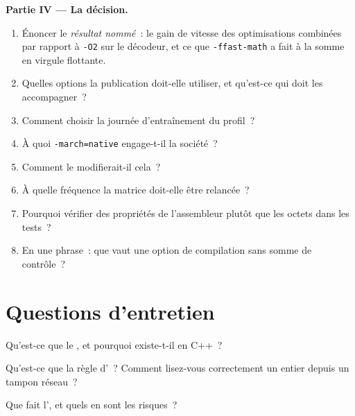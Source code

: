 \begin{problem}
\medskip\noindent\textbf{Partie IV --- La décision.}
\begin{enumerate}[resume]
\item Énoncer le \emph{résultat nommé}~: le gain de vitesse des optimisations combinées par rapport à \texttt{-O2} sur le décodeur, et ce que
\texttt{-ffast-math} a fait à la somme en virgule flottante.
\item Quelles options la publication doit-elle utiliser, et qu'est-ce qui doit les accompagner~?
\item Comment choisir la journée d'entraînement du profil~?
\item À quoi \texttt{-march=native} engage-t-il la société~?
\item Comment le  modifierait-il cela~?
\item À quelle fréquence la matrice doit-elle être relancée~?
\item Pourquoi vérifier des propriétés de l'assembleur plutôt que les octets dans les tests~?
\item En une phrase~: que vaut une option de compilation sans somme de contrôle~?
\end{enumerate}
\end{problem}

\section{Questions d'entretien}

\begin{interviewq}\label{iq:ll:cpp-for-latency-iii-the-compiler:1}
Qu'est-ce que le , et pourquoi existe-t-il en C++~?
\end{interviewq}

\begin{interviewq}\label{iq:ll:cpp-for-latency-iii-the-compiler:2}
Qu'est-ce que la règle d'~? Comment lisez-vous correctement un entier depuis un tampon réseau~?
\end{interviewq}

\begin{interviewq}\label{iq:ll:cpp-for-latency-iii-the-compiler:3}
Que fait l', et quels en sont les risques~?
\end{interviewq}


